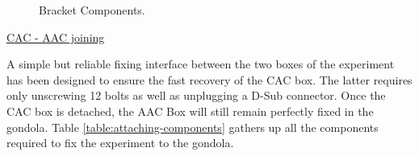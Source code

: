 \begin{figure}[H]
    \noindent{}
    \caption{Bracket Components.}
    \label{fig:bracket}
\end{figure}

\bigskip
\underline{CAC - AAC joining}

\smallskip
A simple but reliable fixing interface between the two boxes of the experiment has been designed to ensure the fast recovery of the CAC box. The latter requires only unscrewing 12 bolts as well as unplugging a D-Sub connector. Once the CAC box is detached, the AAC Box will still remain perfectly fixed in the gondola. Table \ref{table:attaching-components} gathers up all the components required to fix the experiment to the gondola.

